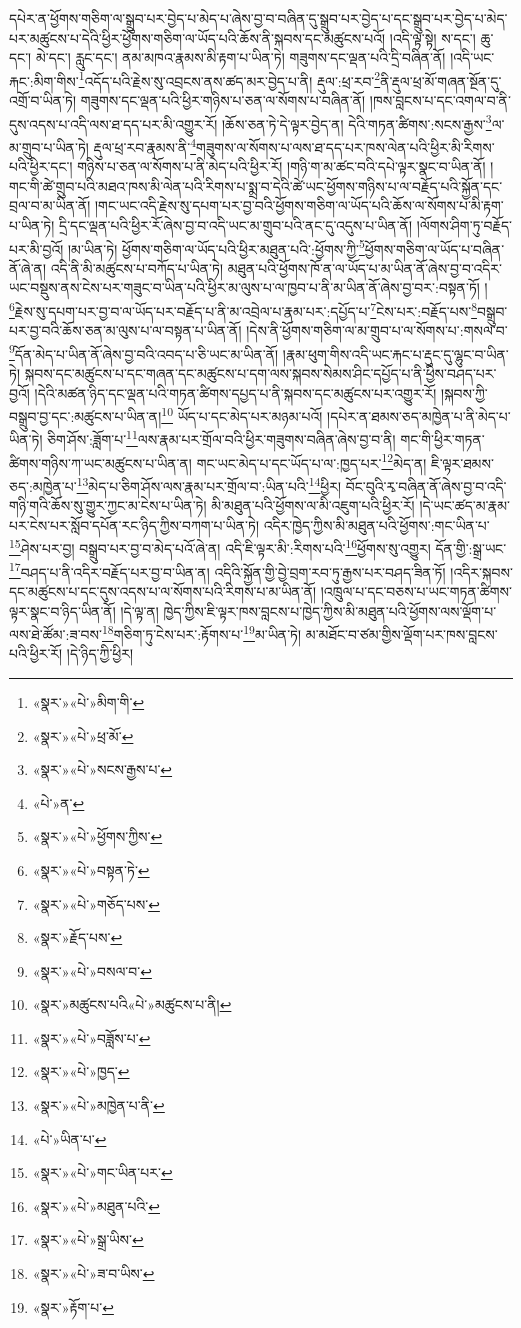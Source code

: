 དཔེར་ན་ཕྱོགས་གཅིག་ལ་སྒྲུབ་པར་བྱེད་པ་མེད་པ་ཞེས་བྱ་བ་བཞིན་དུ་སྒྲུབ་པར་བྱེད་པ་དང་སྒྲུབ་པར་བྱེད་པ་མེད་པར་མཚུངས་པ་དེའི་ཕྱིར་ཕྱོགས་གཅིག་ལ་ཡོད་པའི་ཆོས་ནི་སྐབས་དང་མཚུངས་པའོ། །འདི་ལྟ་སྟེ། ས་དང་། ཆུ་དང་། མེ་དང་། རླུང་དང་། ནམ་མཁའ་རྣམས་མི་རྟག་པ་ཡིན་ཏེ། གཟུགས་དང་ལྡན་པའི་དྲི་བཞིན་ནོ། །འདི་ཡང་རྐང་:མིག་གིས་\footnote{«སྣར་»«པེ་»མིག་གི་}འདོད་པའི་རྗེས་སུ་འབྲངས་ནས་ཚད་མར་བྱེད་པ་ནི། རྡུལ་:ཕྲ་རབ་\footnote{«སྣར་»«པེ་»ཕྲ་མོ་}ནི་རྡུལ་ཕྲ་མོ་གཞན་སྔོན་དུ་འགྲོ་བ་ཡིན་ཏེ། གཟུགས་དང་ལྡན་པའི་ཕྱིར་གཉིས་པ་ཅན་ལ་སོགས་པ་བཞིན་ནོ། །ཁས་བླངས་པ་དང་འགལ་བ་ནི་དུས་འདས་པ་འདི་ལས་ཐ་དད་པར་མི་འགྱུར་རོ། །ཆོས་ཅན་ཏེ་དེ་ལྟར་བྱེད་ན། དེའི་གཏན་ཚིགས་:སངས་རྒྱས་\footnote{«སྣར་»«པེ་»སངས་རྒྱས་པ་}ལ་མ་གྲུབ་པ་ཡིན་ཏེ། རྡུལ་ཕྲ་རབ་རྣམས་ནི་\footnote{«པེ་»ན་}གཟུགས་ལ་སོགས་པ་ལས་ཐ་དད་པར་ཁས་ལེན་པའི་ཕྱིར་མི་རིགས་པའི་ཕྱིར་དང་། གཉིས་པ་ཅན་ལ་སོགས་པ་ནི་མེད་པའི་ཕྱིར་རོ། །གཉི་ག་མ་ཚང་བའི་དཔེ་ལྟར་སྣང་བ་ཡིན་ནོ། །གང་གི་ཚེ་གྲུབ་པའི་མཐའ་ཁས་མི་ལེན་པའི་རིགས་པ་སྨྲ་བ་དེའི་ཚེ་ཡང་ཕྱོགས་གཉིས་པ་ལ་བརྗོད་པའི་སྐྱོན་དང་བྲལ་བ་མ་ཡིན་ནོ། །གང་ཡང་འདི་རྗེས་སུ་དཔག་པར་བྱ་བའི་ཕྱོགས་གཅིག་ལ་ཡོད་པའི་ཆོས་ལ་སོགས་པ་མི་རྟག་པ་ཡིན་ཏེ། དྲི་དང་ལྡན་པའི་ཕྱིར་རོ་ཞེས་བྱ་བ་འདི་ཡང་མ་གྲུབ་པའི་ནང་དུ་འདུས་པ་ཡིན་ནོ། །ལོགས་ཤིག་ཏུ་བརྗོད་པར་མི་བྱའོ། །མ་ཡིན་ཏེ། ཕྱོགས་གཅིག་ལ་ཡོད་པའི་ཕྱིར་མཐུན་པའི་:ཕྱོགས་ཀྱི་\footnote{«སྣར་»«པེ་»ཕྱོགས་ཀྱིས་}ཕྱོགས་གཅིག་ལ་ཡོད་པ་བཞིན་ནོ་ཞེ་ན། འདི་ནི་མི་མཚུངས་པ་བཀོད་པ་ཡིན་ཏེ། མཐུན་པའི་ཕྱོགས་ཁོ་ན་ལ་ཡོད་པ་མ་ཡིན་ནོ་ཞེས་བྱ་བ་འདིར་ཡང་བསྡུས་ནས་ངེས་པར་གཟུང་བ་ཡིན་པའི་ཕྱིར་མ་ལུས་པ་ལ་ཁྱབ་པ་ནི་མ་ཡིན་ནོ་ཞེས་བྱ་བར་:བསྟན་ཏོ། །\footnote{«སྣར་»«པེ་»བསྟན་ཏེ་}རྗེས་སུ་དཔག་པར་བྱ་བ་ལ་ཡོད་པར་བརྗོད་པ་ནི་མ་འབྲེལ་པ་རྣམ་པར་:དཔྱོད་པ་\footnote{«སྣར་»«པེ་»གཅོད་པས་}ངེས་པར་:བརྗོད་པས་\footnote{«སྣར་»རྗོད་པས་}བསྒྲུབ་པར་བྱ་བའི་ཆོས་ཅན་མ་ལུས་པ་ལ་བསྟན་པ་ཡིན་ནོ། །དེས་ནི་ཕྱོགས་གཅིག་ལ་མ་གྲུབ་པ་ལ་སོགས་པ་:གསལ་བ་\footnote{«སྣར་»«པེ་»བསལ་བ་}དོན་མེད་པ་ཡིན་ནོ་ཞེས་བྱ་བའི་འབད་པ་ཅི་ཡང་མ་ཡིན་ནོ། །རྣམ་ཕུག་གིས་འདི་ཡང་རྐང་པ་རྡུང་དུ་ལྷུང་བ་ཡིན་ཏེ། སྐབས་དང་མཚུངས་པ་དང་གཞན་དང་མཚུངས་པ་དག་ལས་སྐབས་སེམས་ཤིང་དཔྱོད་པ་ནི་ཕྱིས་བཤད་པར་བྱའོ། །དེའི་མཚན་ཉིད་དང་ལྡན་པའི་གཏན་ཚིགས་དཔྱད་པ་ནི་སྐབས་དང་མཚུངས་པར་འགྱུར་རོ། །སྐབས་ཀྱི་བསྒྲུབ་བྱ་དང་:མཚུངས་པ་ཡིན་ན།\footnote{«སྣར་»མཚུངས་པའི«པེ་»མཚུངས་པ་ནི།} ཡོད་པ་དང་མེད་པར་མཉམ་པའོ། །དཔེར་ན་ཐམས་ཅད་མཁྱེན་པ་ནི་མེད་པ་ཡིན་ཏེ། ཅིག་ཤོས་:ཟློག་པ་\footnote{«སྣར་»«པེ་»བཟློས་པ་}ལས་རྣམ་པར་གྲོལ་བའི་ཕྱིར་གཟུགས་བཞིན་ཞེས་བྱ་བ་ནི། གང་གི་ཕྱིར་གཏན་ཚིགས་གཉིས་ཀ་ཡང་མཚུངས་པ་ཡིན་ན། གང་ཡང་མེད་པ་དང་ཡོད་པ་ལ་:ཁྱད་པར་\footnote{«སྣར་»«པེ་»ཁྱད་}མེད་ན། ཇི་ལྟར་ཐམས་ཅད་:མཁྱེན་པ་\footnote{«སྣར་»«པེ་»མཁྱེན་པ་ནི་}མེད་པ་ཅིག་ཤོས་ལས་རྣམ་པར་གྲོལ་བ་:ཡིན་པའི་\footnote{«པེ་»ཡིན་པ་}ཕྱིར། བོང་བུའི་རྭ་བཞིན་ནོ་ཞེས་བྱ་བ་འདི་གཉི་གའི་ཆོས་སུ་གྱུར་ཀྱང་མ་ངེས་པ་ཡིན་ཏེ། མི་མཐུན་པའི་ཕྱོགས་ལ་མི་འཇུག་པའི་ཕྱིར་རོ། །དེ་ཡང་ཚད་མ་རྣམ་པར་ངེས་པར་སློབ་དཔོན་རང་ཉིད་ཀྱིས་བཀག་པ་ཡིན་ཏེ། འདིར་ཁྱེད་ཀྱིས་མི་མཐུན་པའི་ཕྱོགས་:གང་ཡིན་པ་\footnote{«སྣར་»«པེ་»གང་ཡིན་པར་}ཤེས་པར་བྱ། བསྒྲུབ་པར་བྱ་བ་མེད་པའོ་ཞེ་ན། འདི་ཇི་ལྟར་མི་:རིགས་པའི་\footnote{«སྣར་»«པེ་»མཐུན་པའི་}ཕྱོགས་སུ་འགྱུར། དོན་གྱི་:སྒྲ་ཡང་\footnote{«སྣར་»«པེ་»སྒྲ་ཡིས་}བཤད་པ་ནི་འདིར་བརྗོད་པར་བྱ་བ་ཡིན་ན། འདིའི་སྐྱོན་གྱི་བྱེ་བྲག་རབ་ཏུ་རྒྱས་པར་བཤད་ཟིན་ཏོ། །འདིར་སྐབས་དང་མཚུངས་པ་དང་དུས་འདས་པ་ལ་སོགས་པའི་རིགས་པ་མ་ཡིན་ནོ། །འཁྲུལ་པ་དང་བཅས་པ་ཡང་གཏན་ཚིགས་ལྟར་སྣང་བ་ཉིད་ཡིན་ནོ། །དེ་ལྟ་ན། ཁྱེད་ཀྱིས་ཇི་ལྟར་ཁས་བླངས་པ་ཁྱེད་ཀྱིས་མི་མཐུན་པའི་ཕྱོགས་ལས་ལྡོག་པ་ལས་ཐེ་ཚོམ་:ཟ་བས་\footnote{«སྣར་»«པེ་»ཟ་བ་ཡིས་}གཅིག་ཏུ་ངེས་པར་:རྟོགས་པ་\footnote{«སྣར་»རྟོག་པ་}མ་ཡིན་ཏེ། མ་མཐོང་བ་ཙམ་གྱིས་ལྡོག་པར་ཁས་བླངས་པའི་ཕྱིར་རོ། །དེ་ཉིད་ཀྱི་ཕྱིར། 